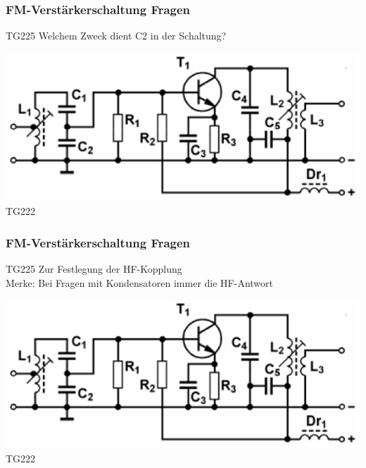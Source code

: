 \begin{frame}
    \frametitle{FM-Verstärkerschaltung Fragen}
    \begin{center}\Large
        \begin{block}{TG225}
		\large Welchem Zweck dient C2 in der Schaltung?
    	\end{block}
        \includegraphics[width=1\textwidth]{a07/TG222.png}\\
        \tiny TG222 \hyperlink{refs}{\cite{bna}}
    \end{center}
\end{frame}

\begin{frame}
    \frametitle{FM-Verstärkerschaltung Fragen}
    \begin{center} \Large
        \begin{block}{TG225}
		\large Zur Festlegung der HF-Kopplung \\
		Merke: Bei Fragen mit Kondensatoren immer die HF-Antwort
    	\end{block}
        \includegraphics[width=1\textwidth]{a07/TG222.png}\\
        \tiny TG222 \hyperlink{refs}{\cite{bna}}
    \end{center}
\end{frame}

